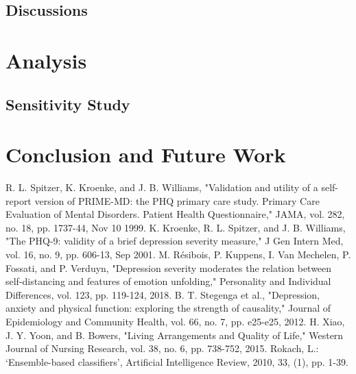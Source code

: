 \documentclass[runningheads]{llncs}
\begin{document}
\subsection{Discussions}
%
%
%
%
%
%
%
%
%
%
%
%
%
%
%
%
%
%
%
%
%
\pagebreak
\section{Analysis}
\subsection{Sensitivity Study}
%
%
%
%
%
%
%
%
%
%
%
%
%
%
%
%
%
%
%
%
%
\pagebreak
\section{Conclusion and Future Work}
%
%
%
\pagebreak
\begin{thebibliography}{8}
%
	R. L. Spitzer, K. Kroenke, and J. B. Williams, "Validation and utility of a self-report version of PRIME-MD: the PHQ primary care study. Primary Care Evaluation of Mental Disorders. Patient Health Questionnaire," JAMA, vol. 282, no. 18, pp. 1737-44, Nov 10 1999.
%
	K. Kroenke, R. L. Spitzer, and J. B. Williams, "The PHQ-9: validity of a brief depression severity measure," J Gen Intern Med, vol. 16, no. 9, pp. 606-13, Sep 2001.
%
	M. Résibois, P. Kuppens, I. Van Mechelen, P. Fossati, and P. Verduyn, "Depression severity moderates the relation between self-distancing and features of emotion unfolding," Personality and Individual Differences, vol. 123, pp. 119-124, 2018.
%
	B. T. Stegenga et al., "Depression, anxiety and physical function: exploring the strength of causality," Journal of Epidemiology and Community Health, vol. 66, no. 7, pp. e25-e25, 2012.
%
	H. Xiao, J. Y. Yoon, and B. Bowers, "Living Arrangements and Quality of Life," Western Journal of Nursing Research, vol. 38, no. 6, pp. 738-752, 2015.
%
%
 Rokach, L.: ‘Ensemble-based classifiers’, Artificial Intelligence Review, 2010, 33, (1), pp. 1-39.
%
%
%
%
%
%
%
%
%
%
%
%
%
%
%
%
\end{thebibliography}
\end{document}
